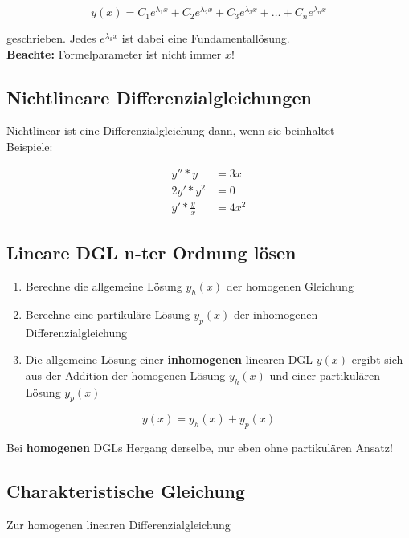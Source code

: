 \documentclass[12pt, a4paper]{scrreprt}
\begin{document}
\[
  y(x) = C_1 e^{\lambda_1 x} + C_2 e^{\lambda_2 x} + C_3 e^{\lambda_3 x} + \dots + C_n e^{\lambda_n x}
\]

geschrieben. Jedes \(e^{\lambda_k x}\) ist dabei eine Fundamentallösung.\\
\textbf{Beachte:} Formelparameter ist nicht immer \(x\)!

\subsection{Nichtlineare Differenzialgleichungen}

Nichtlinear ist eine Differenzialgleichung dann, wenn sie  beinhaltet\\[1em]
Beispiele:

  \begin{align*}
    y''*y &=3x\\
    2y'*y^2 &=0\\
    y'*\frac{y}{x} &= 4x^2
  \end{align*}

\subsection{Lineare DGL n-ter Ordnung lösen}

\begin{enumerate}
\item Berechne die allgemeine Lösung \(y_h(x)\) der homogenen Gleichung
\item Berechne eine partikuläre Lösung \(y_p(x)\) der inhomogenen Differenzialgleichung
\item Die allgemeine Lösung einer \textbf{inhomogenen} linearen DGL \(y(x)\) ergibt sich aus der Addition der homogenen Lösung \(y_h(x)\) und einer partikulären Lösung \(y_p(x)\)
\end{enumerate}

\[
  y(x)=y_h(x)+y_p(x)
\]

Bei \textbf{homogenen} DGLs Hergang derselbe, nur eben ohne partikulären Ansatz!

\subsection{Charakteristische Gleichung}

Zur homogenen linearen Differenzialgleichung
\end{document}
